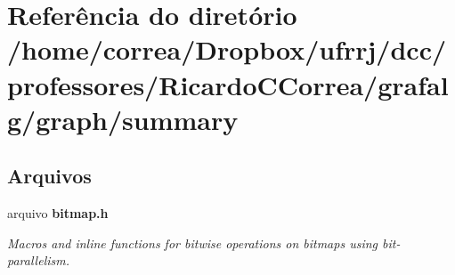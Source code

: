 \section{Referência do diretório /home/correa/\+Dropbox/ufrrj/dcc/professores/\+Ricardo\+C\+Correa/grafalg/graph/summary}
\label{dir_b57d7c07c40056c704208d9721cb8638}
\subsection*{Arquivos}
\begin{DoxyCompactItemize}
\item 
arquivo {\bf bitmap.\+h}
\begin{DoxyCompactList}\small\item\em Macros and inline functions for bitwise operations on bitmaps using bit-\/parallelism. \end{DoxyCompactList}\end{DoxyCompactItemize}
